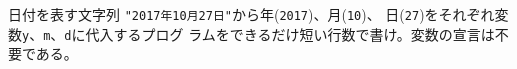 \begin{Prob}\upshape\Must
日付を表す文字列 \Verb+"2017年10月27日"+から年(\Verb+2017+)、月(\Verb+10+)、
 日(\Verb+27+)をそれぞれ変数\Verb+y+、\Verb+m+、\Verb+d+に代入するプログ
 ラムをできるだけ短い行数で書け。変数の宣言は不要である。\\[0.02\textheight]
\end{Prob}
